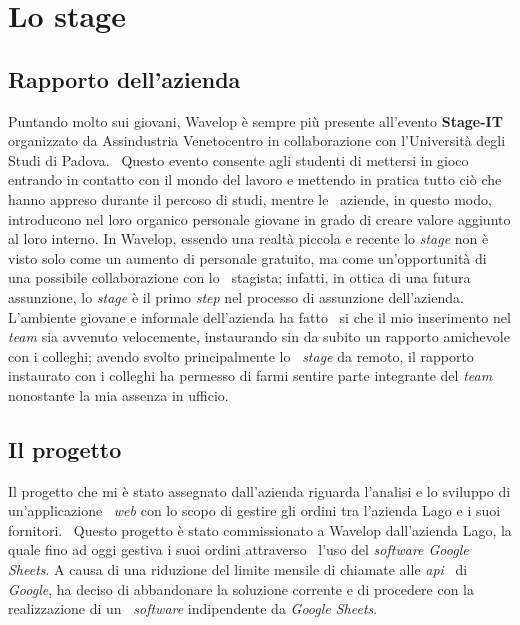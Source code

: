 
\chapter{Lo stage}
\label{cap:stage}
\section{Rapporto dell'azienda}
Puntando molto sui giovani, Wavelop è sempre più presente all'evento \textbf{Stage-IT} organizzato da Assindustria Venetocentro in collaborazione con l'Università degli Studi di Padova. \
Questo evento consente agli studenti di mettersi in gioco entrando in contatto con il mondo del lavoro e mettendo in pratica tutto ciò che hanno appreso durante il percoso di studi, mentre le \
aziende, in questo modo, introducono nel loro organico personale giovane in grado di creare valore aggiunto al loro interno.
In Wavelop, essendo una realtà piccola e recente lo \emph{stage} non è visto solo come un aumento di personale gratuito, ma come un'opportunità di una possibile collaborazione con lo \
stagista; infatti, in ottica di una futura assunzione, lo \emph{stage} è il primo \emph{step} nel processo di assunzione dell'azienda. L'ambiente giovane e informale dell'azienda ha fatto \
si che il mio inserimento nel \emph{team} sia avvenuto velocemente, instaurando sin da subito un rapporto amichevole con i colleghi; avendo svolto principalmente lo \
\emph{stage} da remoto, il rapporto instaurato con i colleghi ha permesso di farmi sentire parte integrante del \emph{team} nonostante la mia assenza in ufficio.

\section{Il progetto}
Il progetto che mi è stato assegnato dall'azienda riguarda l'analisi e lo sviluppo di un'applicazione \
\emph{web} con lo scopo di gestire gli ordini tra l'azienda Lago e i suoi fornitori. \ 
Questo progetto è stato commissionato a Wavelop dall'azienda Lago, la quale fino ad oggi gestiva i suoi ordini attraverso \
l'uso del \emph{software Google Sheets}. A causa di una riduzione del limite mensile di chiamate alle \emph{\acrshort{api}} \
di \emph{Google}, ha deciso di abbandonare la soluzione corrente e di procedere con la realizzazione di un \
\emph{software} indipendente da \emph{Google Sheets}. \\

